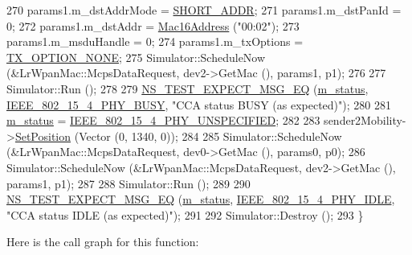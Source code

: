 \begin{DoxyCode}
270   params1.m\_dstAddrMode = \hyperlink{group__lr-wpan_gga9ea4702ab11d5329e1593afebce06bbba7bf58267dde39bdabfeeb5793450c5e3}{SHORT\_ADDR};
271   params1.m\_dstPanId = 0;
272   params1.m\_dstAddr = \hyperlink{classns3_1_1Mac16Address}{Mac16Address} (\textcolor{stringliteral}{"00:02"});
273   params1.m\_msduHandle = 0;
274   params1.m\_txOptions = \hyperlink{group__lr-wpan_gga74ea891230ebf45d80d69a67266930a4a873c8b896435efcdd1c058668efb88ea}{TX\_OPTION\_NONE};
275   Simulator::ScheduleNow (&LrWpanMac::McpsDataRequest, dev2->GetMac (), params1, p1);
276 
277   Simulator::Run ();
278 
279   \hyperlink{group__testing_ga7304ba46a28d8cf08dfdfd6499cf7068}{NS\_TEST\_EXPECT\_MSG\_EQ} (\hyperlink{classLrWpanCcaTestCase_adbf2d30b281bb65318deaef492ceecd3}{m\_status}, 
      \hyperlink{group__lr-wpan_gga6494269d13d45c511a07b7ccbb1de754a14641e5190b66ec8ec3903218058dc46}{IEEE\_802\_15\_4\_PHY\_BUSY}, \textcolor{stringliteral}{"CCA status BUSY (as expected)"});
280 
281   \hyperlink{classLrWpanCcaTestCase_adbf2d30b281bb65318deaef492ceecd3}{m\_status} = \hyperlink{group__lr-wpan_gga6494269d13d45c511a07b7ccbb1de754a33aedad985a3e4dd7a0c6790a2c677a0}{IEEE\_802\_15\_4\_PHY\_UNSPECIFIED};
282 
283   sender2Mobility->\hyperlink{classns3_1_1MobilityModel_ac584b3d5a309709d2f13ed6ada1e7640}{SetPosition} (Vector (0, 1340, 0));
284 
285   Simulator::ScheduleNow (&LrWpanMac::McpsDataRequest, dev0->GetMac (), params0, p0);
286   Simulator::ScheduleNow (&LrWpanMac::McpsDataRequest, dev2->GetMac (), params1, p1);
287 
288   Simulator::Run ();
289 
290   \hyperlink{group__testing_ga7304ba46a28d8cf08dfdfd6499cf7068}{NS\_TEST\_EXPECT\_MSG\_EQ} (\hyperlink{classLrWpanCcaTestCase_adbf2d30b281bb65318deaef492ceecd3}{m\_status}, 
      \hyperlink{group__lr-wpan_gga6494269d13d45c511a07b7ccbb1de754af3994414efcd2fac7e312ecb9b3ebd70}{IEEE\_802\_15\_4\_PHY\_IDLE}, \textcolor{stringliteral}{"CCA status IDLE (as expected)"});
291 
292   Simulator::Destroy ();
293 \}
\end{DoxyCode}


Here is the call graph for this function\+:


